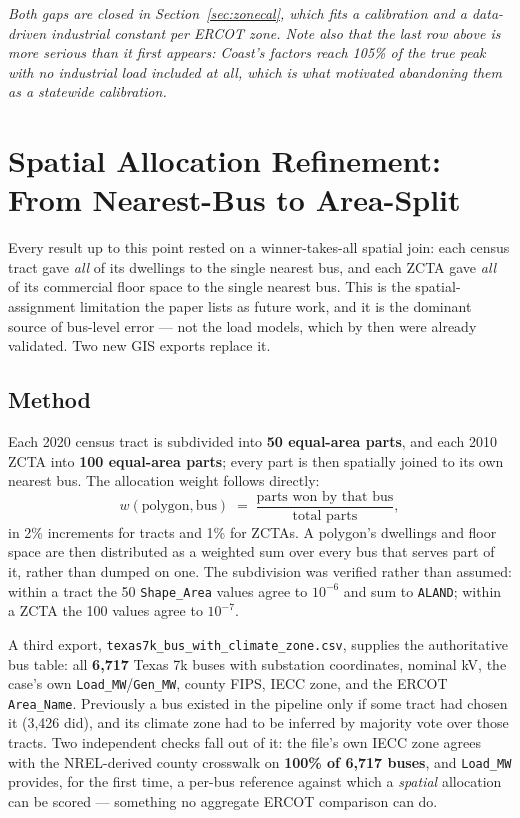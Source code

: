 \documentclass[11pt]{article}
\begin{document}
\emph{Both gaps are closed in Section~\ref{sec:zonecal}, which fits a calibration and a
data-driven industrial constant per ERCOT zone. Note also that the last row above is
more serious than it first appears: Coast's factors reach 105\% of the true peak
\emph{with no industrial load included at all}, which is what motivated abandoning them
as a statewide calibration.}

\section{Spatial Allocation Refinement: From Nearest-Bus to Area-Split}
\label{sec:areasplit}

Every result up to this point rested on a winner-takes-all spatial join: each census
tract gave \emph{all} of its dwellings to the single nearest bus, and each ZCTA gave
\emph{all} of its commercial floor space to the single nearest bus. This is the
spatial-assignment limitation the paper lists as future work, and it is the dominant
source of bus-level error --- not the load models, which by then were already validated.
Two new GIS exports replace it.

\subsection{Method}

Each 2020 census tract is subdivided into \textbf{50 equal-area parts}, and each 2010
ZCTA into \textbf{100 equal-area parts}; every part is then spatially joined to its own
nearest bus. The allocation weight follows directly:
\[
w(\text{polygon}, \text{bus}) \;=\; \frac{\text{parts won by that bus}}{\text{total parts}},
\]
in 2\% increments for tracts and 1\% for ZCTAs. A polygon's dwellings and floor space
are then distributed as a weighted sum over every bus that serves part of it, rather
than dumped on one. The subdivision was verified rather than assumed: within a tract
the 50 \texttt{Shape\_Area} values agree to $10^{-6}$ and sum to \texttt{ALAND}; within a
ZCTA the 100 values agree to $10^{-7}$.

A third export, \texttt{texas7k\_bus\_with\_climate\_zone.csv}, supplies the authoritative
bus table: all \textbf{6{,}717} Texas 7k buses with substation coordinates, nominal kV,
the case's own \texttt{Load\_MW}/\texttt{Gen\_MW}, county FIPS, IECC zone, and the ERCOT
\texttt{Area\_Name}. Previously a bus existed in the pipeline only if some tract had
chosen it (3{,}426 did), and its climate zone had to be inferred by majority vote over
those tracts. Two independent checks fall out of it: the file's own IECC zone agrees
with the NREL-derived county crosswalk on \textbf{100\% of 6{,}717 buses}, and
\texttt{Load\_MW} provides, for the first time, a per-bus reference against which a
\emph{spatial} allocation can be scored --- something no aggregate ERCOT comparison can do.
\end{document}
